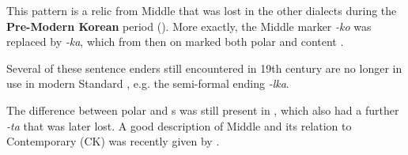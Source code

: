 \noindent This pattern is a relic from Middle  that was lost in the other dialects during the \textbf{Pre-Modern Korean} period (). More exactly, the Middle  marker \textit{-ko} was replaced by \textit{-ka}, which from then on marked both polar and content  \citep[456]{Sohn2015}.

\begin{table}
\caption{Selected Pre-Modern Korean verb endings in the 19\textsuperscript{th} century \citep[456]{Sohn2015}}
\label{tab:kore:5}
\end{table}

Several of these sentence enders still encountered in 19th century  are no longer in use in modern Standard , e.g. the semi-formal  ending \textit{-lka}.

The difference between polar and s was still present in , which also had a further  \textit{-ta} that was later lost. A good description of Middle   and its relation to Contemporary  (CK) was recently given by \citet[448]{Sohn2015}.

